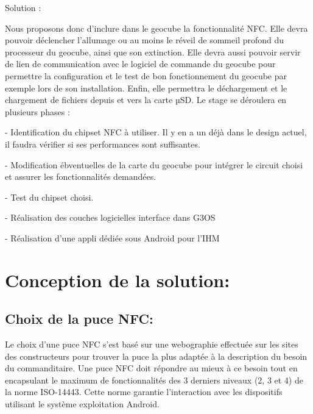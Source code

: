 \documentclass{themeensg}
\begin{document}
Solution :

Nous proposons donc d’inclure dans le geocube la fonctionnalité NFC. Elle devra pouvoir déclencher l’allumage ou au moins le réveil de sommeil profond du processeur du geocube, ainsi que son extinction. Elle devra aussi pouvoir servir de lien de communication avec le logiciel de commande du geocube pour permettre la configuration et le test de bon fonctionnement du geocube par exemple lors de son installation. Enfin, elle permettra le déchargement et le chargement de fichiers depuis et vers la carte µSD.
Le stage se déroulera en plusieurs phases :

- Identification du chipset NFC à utiliser. Il y en a un déjà dans le design actuel, il faudra vérifier si ses performances sont suffisantes.

- Modification ébventuelles de la carte du geocube pour intégrer le circuit choisi et assurer les fonctionnalités demandées.

- Test du chipset choisi.

- Réalisation des couches logicielles interface dans G3OS

- Réalisation d’une appli dédiée sous Android pour l’IHM

\section{Conception de la solution:}
\subsection{Choix de la puce NFC:}
Le choix d'une puce NFC s'est basé sur une webographie effectuée sur les sites des constructeurs pour trouver la puce la plus adaptée à la description du besoin du commanditaire. Une puce NFC doit répondre au mieux à ce besoin tout en encapsulant le maximum de fonctionnalités des 3 derniers niveaux (2, 3 et 4) de la norme ISO-14443. Cette norme garantie l'interaction avec les dispositifs utilisant le système exploitation Android.
\end{document}
